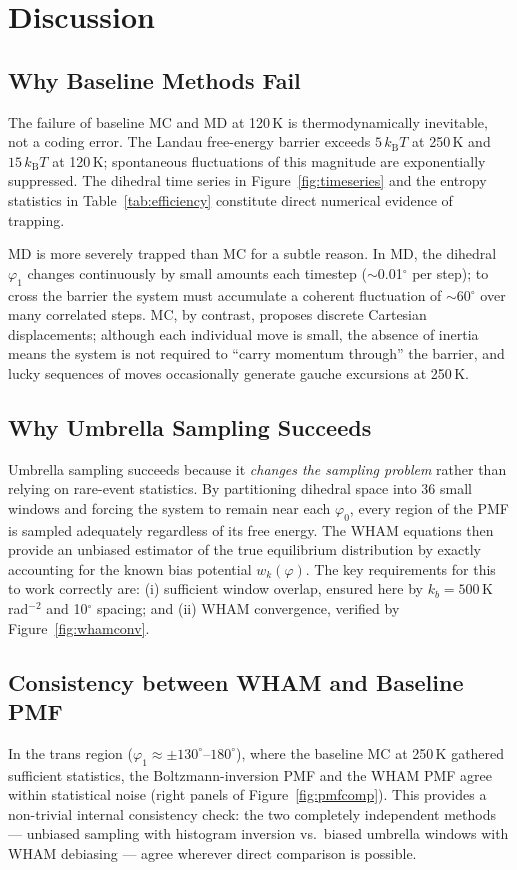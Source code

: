 \documentclass[12pt,a4paper]{article}
\begin{document}
\section{Discussion}
\label{sec:discussion}

\subsection{Why Baseline Methods Fail}
The failure of baseline MC and MD at 120\,K is thermodynamically
inevitable, not a coding error.  The Landau free-energy barrier exceeds
$5\,k_{\mathrm{B}}T$ at 250\,K and $15\,k_{\mathrm{B}}T$ at 120\,K;
spontaneous fluctuations of this magnitude are exponentially suppressed.
The dihedral time series in Figure~\ref{fig:timeseries} and the entropy
statistics in Table~\ref{tab:efficiency} constitute direct numerical
evidence of trapping.

MD is more severely trapped than MC for a subtle reason.  In MD,
the dihedral $\varphi_1$ changes continuously by small amounts each
timestep ($\sim$0.01$^{\circ}$ per step); to cross the barrier the system
must accumulate a coherent fluctuation of $\sim$60$^{\circ}$ over many
correlated steps.  MC, by contrast, proposes discrete Cartesian
displacements; although each individual move is small, the absence of
inertia means the system is not required to ``carry momentum through''
the barrier, and lucky sequences of moves occasionally generate gauche
excursions at 250\,K.

\subsection{Why Umbrella Sampling Succeeds}
Umbrella sampling succeeds because it \emph{changes the sampling problem}
rather than relying on rare-event statistics.  By partitioning dihedral
space into 36 small windows and forcing the system to remain near each
$\varphi_0$, every region of the PMF is sampled adequately regardless
of its free energy.  The WHAM equations then provide an unbiased estimator
of the true equilibrium distribution by exactly accounting for the known
bias potential $w_k(\varphi)$.  The key requirements for this to work
correctly are: (i) sufficient window overlap, ensured here by $k_b = 500$\,K\,rad$^{-2}$
and 10$^{\circ}$ spacing; and (ii) WHAM convergence, verified by
Figure~\ref{fig:whamconv}.

\subsection{Consistency between WHAM and Baseline PMF}
In the trans region ($\varphi_1 \approx \pm 130^{\circ}$--$180^{\circ}$),
where the baseline MC at 250\,K gathered sufficient statistics, the
Boltzmann-inversion PMF and the WHAM PMF agree within statistical noise
(right panels of Figure~\ref{fig:pmfcomp}).  This provides a non-trivial
internal consistency check: the two completely independent methods ---
unbiased sampling with histogram inversion vs.\ biased umbrella windows
with WHAM debiasing --- agree wherever direct comparison is possible.
\end{document}
